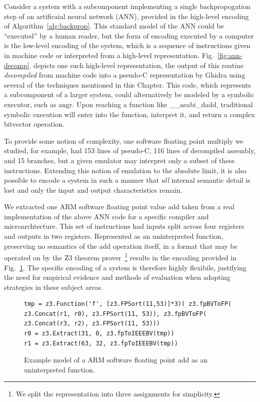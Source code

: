 \begin{example}
Consider a system with a subcomponent implementing a single backpropogation step of an artificaial neural network (ANN), provided in the high-level encoding of Algorithm~\ref{alg:backprop}.
This standard model of the ANN could be ``executed'' by a human reader, but the form of encoding executed by a computer is the low-level encoding of the system, which is a sequence of instructions given in machine code or interpreted from a high-level representation.
Fig.~\ref{fig:ann-decomp}. depicts one such high-level representation, the output of this routine \emph{decompiled} from machine code into a pseudo-C representation by Ghidra using several of the techniques mentioned in this Chapter.
This code, which represents a subcomponent of a larger system, could alternatively be modeled by a symbolic executor, such as angr.
Upon reaching a function like \_\_aeabi\_dadd, traditional symbolic execution will enter into the function, interpret it, and return a complex bitvector operation.

To provide some notion of complexity, one software floating point multiply we studied, for example, had 153 lines of pseudo-C, 116 lines of decompiled assembly, and 15 branches, but a given emulator may interpret only a subset of these instructions.
Extending this notion of emulation to the absolute limit, it is also possible to encode a system in such a manner that \emph{all} internal semantic detail is lost and only the input and output characteristics remain.

We extracted one ARM software floating point value add taken from a real implementation of the above ANN code for a specific compiler and microarchtecture.
This set of instructions had inputs split across four registers and outputs in two registers.
	Represented as an uninterpreted function, preserving no semantics of the add operation itself, in a format that may be operated on by the Z3 theorem prover~\cite{zthree}\footnote{We split the representation into three assignments for simplicity.} results in the encoding provided in Fig.~\ref{fig:ann-spec}.
The specific encoding of a system is therefore highly flexibile, justifying the need for empirical evidence and methods of evaluation when adopting strategies in these subject areas.

\begin{figure}
  \begin{lstlisting}
tmp = z3.Function('f', [z3.FPSort(11,53)]*3)( z3.fpBVToFP( z3.Concat(r1, r0), z3.FPSort(11, 53)), z3.fpBVToFP( z3.Concat(r3, r2), z3.FPSort(11, 53)))
r0 = z3.Extract(31, 0, z3.fpToIEEEBV(tmp))
r1 = z3.Extract(63, 32, z3.fpToIEEEBV(tmp))
  \end{lstlisting}
	\caption{Example model of a ARM software floating point add as an uninterpreted function.}
  \label{fig:ann-spec}
\end{figure}

\end{example}

